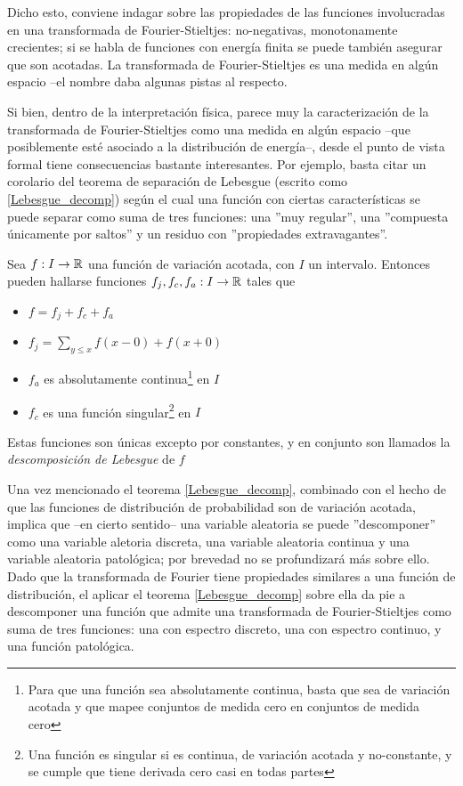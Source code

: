 
Dicho esto, conviene indagar sobre las propiedades de las
funciones involucradas en una
transformada de Fourier-Stieltjes: no-negativas, monotonamente crecientes; si se habla de funciones
con energ\'ia finita se puede tambi\'en asegurar que son acotadas.
La transformada de Fourier-Stieltjes es una medida en alg\'un espacio --el nombre daba
algunas pistas al respecto. 

Si bien, dentro de la interpretaci\'on f\'isica, parece muy
la caracterizaci\'on de la transformada de Fourier-Stieltjes como una medida en alg\'un espacio 
--que posiblemente est\'e asociado a la distribuci\'on de energ\'ia--, desde el punto de vista
formal tiene consecuencias bastante interesantes.
Por ejemplo, basta citar un corolario del teorema de separaci\'on de Lebesgue (escrito
como \ref{Lebesgue_decomp}) seg\'un el cual una funci\'on con ciertas caracter\'isticas se puede 
separar como suma de tres funciones: una ''muy regular'', una ''compuesta \'unicamente por 
saltos'' y un residuo con ''propiedades extravagantes''.

\begin{thrm}
Sea $f:I\rightarrow \mathbb{R}$ una funci\'on de variaci\'on acotada, con $I$ un intervalo. Entonces
pueden hallarse funciones $f_j, f_c, f_a :I\rightarrow \mathbb{R}$ tales que
\begin{itemize}
\item $f = f_j+ f_c+ f_a$
\item $f_j = \sum_{y \leq x} f(x-0) + f(x+0)$
\item $f_a$ es absolutamente continua\footnote{Para que una funci\'on sea absolutamente continua,
basta que sea de variaci\'on acotada y que mapee conjuntos de medida cero en conjuntos de medida
cero} en $I$
\item $f_c$ es una funci\'on singular\footnote{Una funci\'on es singular si es continua, 
de variaci\'on acotada y no-constante, y se cumple que tiene derivada cero casi en todas partes} 
en $I$
\end{itemize}
Estas funciones son \'unicas excepto por constantes, y en conjunto son llamados la 
\textit{descomposici\'on de Lebesgue} de $f$
\label{Lebesgue_decomp}
\end{thrm}

Una vez mencionado el teorema \ref{Lebesgue_decomp}, combinado con el hecho de que las funciones de 
distribuci\'on de probabilidad
son de variaci\'on acotada, implica que --en cierto sentido-- una variable aleatoria se puede
''descomponer'' como una variable aletoria discreta, una variable aleatoria continua y una
variable aleatoria patol\'ogica; por brevedad no se profundizar\'a m\'as sobre ello.
Dado que la transformada de Fourier tiene propiedades similares a una funci\'on de distribuci\'on,
el aplicar el teorema \ref{Lebesgue_decomp} sobre ella da pie a descomponer una funci\'on
que admite una transformada de Fourier-Stieltjes como suma de tres funciones: una
con espectro discreto, una con espectro continuo, y una funci\'on patol\'ogica.

